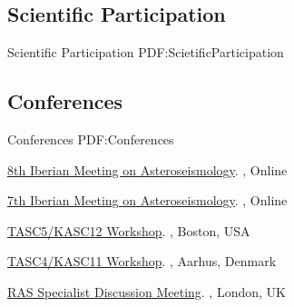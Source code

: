 \documentclass[letterpaper,10pt,oneside]{article}
\begin{document}
\begin{body}

\section
{Scientific Participation}
{Scientific Participation}
{PDF:ScietificParticipation}



\subsection
{Conferences}
{Conferences}
{PDF:Conferences}

\GapNoBreak
\BulletItem
\href{http://www.iastro.pt/research/conferences/8th-imas/}{8th Iberian Meeting on Asteroseismology}. , Online

\GapNoBreak
\BulletItem
\href{https://7thimas.cab.inta-csic.es/main/index.php}{7th Iberian Meeting on Asteroseismology}. , Online

\GapNoBreak
\BulletItem
\href{https://web.mit.edu/tasc5/}{TASC5/KASC12 Workshop}. , Boston, USA

\GapNoBreak
\BulletItem
\href{http://conferences.au.dk/tasc4/}{TASC4/KASC11 Workshop}. , Aarhus, Denmark

\GapNoBreak
\BulletItem
\href{https://sites.google.com/view/ras-evolsystems/home}{RAS Specialist Discussion Meeting}. , London, UK


\end{body}
\end{document}
